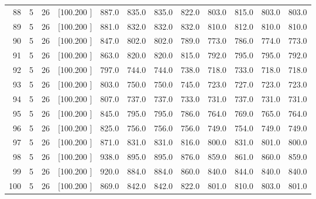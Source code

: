 \documentclass[12pt,a4paper]{article}
\begin{document}
\begin{center}
{\begin{tabular}{r r r r r r r r r r r r}
  88&  5& 26&[100.200   ]&   887.0&   835.0&   835.0&   822.0&   803.0&   815.0&   803.0&   803.0\\[-0.02in]
  89&  5& 26&[100.200   ]&   881.0&   832.0&   832.0&   832.0&   810.0&   812.0&   810.0&   810.0\\[-0.02in]
  90&  5& 26&[100.200   ]&   847.0&   802.0&   802.0&   789.0&   773.0&   786.0&   774.0&   773.0\\[-0.02in]
  91&  5& 26&[100.200   ]&   863.0&   820.0&   820.0&   815.0&   792.0&   795.0&   795.0&   792.0\\[-0.02in]
  92&  5& 26&[100.200   ]&   797.0&   744.0&   744.0&   738.0&   718.0&   733.0&   718.0&   718.0\\[-0.02in]
  93&  5& 26&[100.200   ]&   803.0&   750.0&   750.0&   745.0&   723.0&   727.0&   723.0&   723.0\\[-0.02in]
  94&  5& 26&[100.200   ]&   807.0&   737.0&   737.0&   733.0&   731.0&   737.0&   731.0&   731.0\\[-0.02in]
  95&  5& 26&[100.200   ]&   845.0&   795.0&   795.0&   786.0&   764.0&   769.0&   765.0&   764.0\\[-0.02in]
  96&  5& 26&[100.200   ]&   825.0&   756.0&   756.0&   756.0&   749.0&   754.0&   749.0&   749.0\\[-0.02in]
  97&  5& 26&[100.200   ]&   871.0&   831.0&   831.0&   816.0&   800.0&   831.0&   801.0&   800.0\\[-0.02in]
  98&  5& 26&[100.200   ]&   938.0&   895.0&   895.0&   876.0&   859.0&   861.0&   860.0&   859.0\\[-0.02in]
  99&  5& 26&[100.200   ]&   920.0&   884.0&   884.0&   860.0&   840.0&   844.0&   840.0&   840.0\\[-0.02in]
 100&  5& 26&[100.200   ]&   869.0&   842.0&   842.0&   822.0&   801.0&   810.0&   803.0&   801.0\\[-0.02in]

\hline
\end{tabular}}
\end{center}
\end{document}
